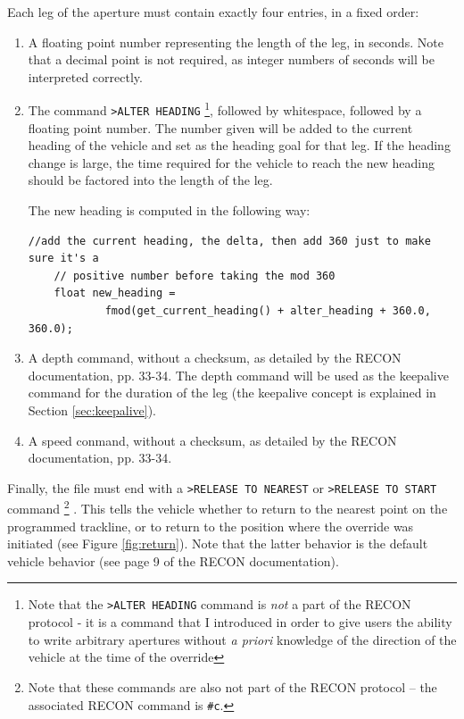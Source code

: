 \documentclass[11pt]{article} %
\begin{document}
Each leg of the aperture must contain exactly four entries, in a fixed order:
\begin{enumerate}
  \item A floating point number representing the length of the leg, in seconds. Note that a decimal point is not required, as integer numbers of seconds
  	will be interpreted correctly.
  \item The command \mbox{\texttt{>ALTER HEADING}}
	\footnote{Note that the \mbox{\texttt{>ALTER HEADING}} command is \emph{not} a part of the RECON protocol - it is a command that I 
	introduced in order to give users the ability to write arbitrary apertures without \textit{a priori} knowledge of the direction
	of the vehicle at the time of the override},
	followed by whitespace, followed by a floating point number. 
	The number given will be added
  	to the current heading of the vehicle and set as the heading goal for that leg. If the heading change is large, the time required for the vehicle to 
  	reach the new heading should be factored into the length of the leg.
  	
	The new heading is computed in the following way:
	\begin{Verbatim}[fontsize=\footnotesize]
	//add the current heading, the delta, then add 360 just to make sure it's a
	// positive number before taking the mod 360
	float new_heading = 
			fmod(get_current_heading() + alter_heading + 360.0, 360.0);
	\end{Verbatim}

  \item A depth command, without a checksum, as detailed by the RECON documentation, pp. 33-34. The depth command will be used as
  	the keepalive command for the duration of the leg (the keepalive concept is explained in Section \ref{sec:keepalive}).
  \item A speed conmand, without a checksum, as detailed by the RECON documentation, pp. 33-34. 
\end{enumerate}

Finally, the file must end with a \mbox{\texttt{>RELEASE TO NEAREST}} or \mbox{\texttt{>RELEASE TO START}} command
\footnote{Note that these commands are also not part of the RECON protocol -- the associated RECON command is \mbox{\texttt{\#c}}. } .
This tells the vehicle
whether to return to the nearest point on the programmed trackline, or to return to the position where the override was 
initiated (see Figure \ref{fig:return}).
Note that the latter behavior is the default vehicle behavior (see page 9 of the RECON documentation).
\end{document}
